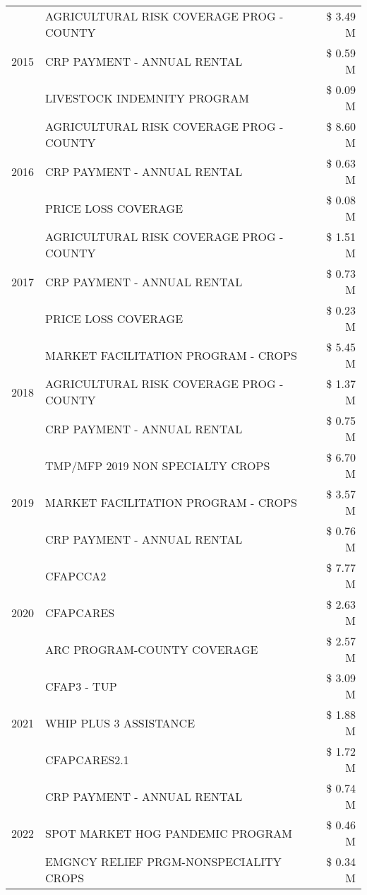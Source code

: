 \begin{tabular}{llr}
\multirow[t]{3}{*}{2015} & AGRICULTURAL RISK COVERAGE PROG - COUNTY & \$ 3.49 M \\
 & CRP PAYMENT - ANNUAL RENTAL & \$ 0.59 M \\
 & LIVESTOCK INDEMNITY PROGRAM & \$ 0.09 M \\
\cline{1-3}
\multirow[t]{3}{*}{2016} & AGRICULTURAL RISK COVERAGE PROG - COUNTY & \$ 8.60 M \\
 & CRP PAYMENT - ANNUAL RENTAL & \$ 0.63 M \\
 & PRICE LOSS COVERAGE & \$ 0.08 M \\
\cline{1-3}
\multirow[t]{3}{*}{2017} & AGRICULTURAL RISK COVERAGE PROG - COUNTY & \$ 1.51 M \\
 & CRP PAYMENT - ANNUAL RENTAL & \$ 0.73 M \\
 & PRICE LOSS COVERAGE & \$ 0.23 M \\
\cline{1-3}
\multirow[t]{3}{*}{2018} & MARKET FACILITATION PROGRAM - CROPS & \$ 5.45 M \\
 & AGRICULTURAL RISK COVERAGE PROG - COUNTY & \$ 1.37 M \\
 & CRP PAYMENT - ANNUAL RENTAL & \$ 0.75 M \\
\cline{1-3}
\multirow[t]{3}{*}{2019} & TMP/MFP 2019 NON SPECIALTY CROPS & \$ 6.70 M \\
 & MARKET FACILITATION PROGRAM - CROPS & \$ 3.57 M \\
 & CRP PAYMENT - ANNUAL RENTAL & \$ 0.76 M \\
\cline{1-3}
\multirow[t]{3}{*}{2020} & CFAPCCA2 & \$ 7.77 M \\
 & CFAPCARES & \$ 2.63 M \\
 & ARC PROGRAM-COUNTY COVERAGE & \$ 2.57 M \\
\cline{1-3}
\multirow[t]{3}{*}{2021} & CFAP3 - TUP & \$ 3.09 M \\
 & WHIP PLUS 3 ASSISTANCE & \$ 1.88 M \\
 & CFAPCARES2.1 & \$ 1.72 M \\
\cline{1-3}
\multirow[t]{3}{*}{2022} & CRP PAYMENT - ANNUAL RENTAL & \$ 0.74 M \\
 & SPOT MARKET HOG PANDEMIC PROGRAM & \$ 0.46 M \\
 & EMGNCY RELIEF PRGM-NONSPECIALITY CROPS & \$ 0.34 M \\
\cline{1-3}
\bottomrule
\end{tabular}
